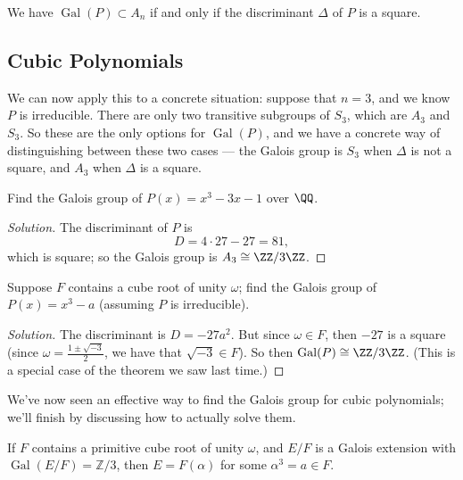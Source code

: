 \begin{proposition}
We have $\operatorname{Gal}(P) \subset A_n$ if and only if  the discriminant $\Delta$ of $P$ is a square. 
\end{proposition}

\subsection{Cubic Polynomials}

We can now apply this to a concrete situation: suppose that $n = 3$, and we know $P$ is irreducible. There are only two transitive subgroups of $S_3$, which are $A_3$ and $S_3$. So these are the only options for $\operatorname{Gal}(P)$, and we have a concrete way of distinguishing between these two cases --- the Galois group is $S_3$ when $\Delta$ is not a square, and $A_3$ when $\Delta$ is a square. 

\begin{example}
    Find the Galois group of $P(x) = x^3 - 3x - 1$ over $\QQ$. 
\end{example}

\begin{proof}[Solution]
    The discriminant of $P$ is \[D = 4\cdot 27 - 27 = 81,\] which is square; so the Galois group is $A_3 \cong \ZZ/3\ZZ$. 
\end{proof}

\begin{example}
    Suppose $F$ contains a cube root of unity $\omega$; find the Galois group of $P(x) = x^3 - a$ (assuming $P$ is irreducible). 
\end{example}

\begin{proof}[Solution]
The discriminant is $D = -27a^2$. But since $\omega \in F$, then $-27$ is a square (since $\omega = \frac{1 \pm \sqrt{-3}}{2}$, we have that $\sqrt{-3} \in F$). So then $\operatorname{Gal}(P) \cong \ZZ/3\ZZ$. (This is a special case of the theorem we saw last time.)
\end{proof}

We've now seen an effective way to find the Galois group for cubic polynomials; we'll finish by discussing how to actually solve them.

\begin{proposition}
    If $F$ contains a primitive cube root of unity $\omega$, and $E/F$ is a Galois extension with $\operatorname{Gal}(E/F) = \mathbb{Z}/3$, then $E = F(\alpha)$ for some $\alpha^3 = a \in F$. 
\end{proposition}

